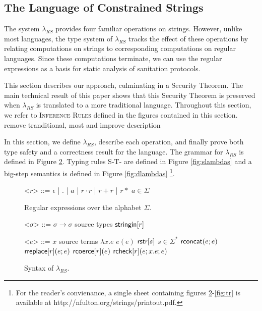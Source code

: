 \documentclass[9pt]{sig-alternate}
\newcommand{\todo}[1]{{\color{red} #1}}
\theoremstyle{definition}
\newcommand{\lambdas}{\lambda_{RS}}
\newcommand{\sisubst}[3]{{\sf rreplace}[#1](#2;#3)} \newcommand{\rreplace}[3]{{\sf rreplace}[#1](#2;#3)} %
\newcommand{\rcoerce}[2]{{\sf rcoerce}[#1](#2)}
\newcommand{\sistr}[1]{{\sf rstr}[#1]}   \newcommand{\rstr}[1]{{\sf rstr}[#1]} %
\newcommand{\rcheck}[4]{ {\sf rcheck}[#1](#2;#3;#4) }
\newcommand{\strin}[1]{\sistr{#1}}
\newcommand{\rsconcat}[2]{{\sf rconcat}(#1;#2)} \newcommand{\rconcat}[2]{{\sf rconcat}(#1;#2)} %
\newcommand{\stringin}[1]{{\sf stringin}[#1]}
\begin{document}
\subsection{The Language of Constrained Strings}\label{sec:rs}


The system $\lambdas$ provides four familiar operations on strings. However, unlike most languages, the type system of $\lambdas$ tracks the effect of these operations by relating computations on strings to corresponding computations on regular languages. 
Since these computations terminate, we can use the regular expressions as a basis for static analysis of sanitation protocols.

This section describes our approach, culminating in a Security Theorem. The main technical result of this paper shows that this Security Theorem is preserved when $\lambdas$ is translated to a more traditional language. Throughout this section, we refer to \textsc{Inference Rules} defined in the figures contained in this section.
\todo{remove tranditional, most and improve description}

In this section, we define $\lambdas$, describe each operation, and finally prove both type safety and a correctness result for the language.
The grammar for $\lambdas$ is defined in Figure \ref{fig:glambdas}. Typing rules \textsc{S-T-} are defined in Figure \ref{fig:slambdas} and a big-step semantics
is defined in Figure \ref{fig:dlambdas}
\footnote{For the reader's convienance, a single sheet containing figures \ref{fig:glambdas}-\ref{fig:tr} is available at http://nfulton.org/strings/printout.pdf.}.

\renewcommand{\grammarlabel}[2]{#1\hfill#2}
\begin{figure}[h]
\begin{grammar}
<$r$> ::= $\epsilon$ | $.$ | $a$ | $r \cdot r$ | $r + r$ | $r*$ \hfill $a \in \Sigma$

\caption{Regular expressions over the alphabet $\Sigma$.}
\label{fig:regex}
\end{grammar}
\end{figure}

\begin{figure}[h]
\begin{grammar}

<$\sigma$> ::=  $\sigma \rightarrow \sigma$     \hfill  source types          \alt
$\stringin{r}$         

<$e$> ::= 
      $x$ \hfill source terms \alt 
      $\lambda x . e$ \alt
      $e(e)$ \alt
      $\strin{s}$ \hfill $s \in \Sigma^{*}$ \alt
      $\rsconcat{e}{e}$ \alt
      $\sisubst{r}{e}{e}$ \alt
      $\rcoerce{r}{e}$ \alt
      $\rcheck{r}{e}{x.e}{e}$
\caption{Syntax of $\lambda_{RS}$.}
\label{fig:glambdas}
\end{grammar}
\end{figure}
\end{document}
